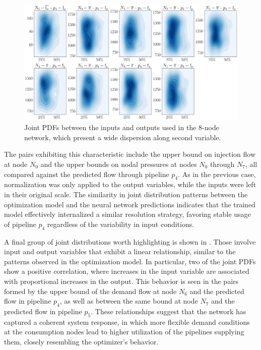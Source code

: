 \begin{figure}[htbp]
    \begin{center}
        \includegraphics[width=.7\textwidth]{figures/Chapter_NonLinealCensnet/inputs_outputs_1 KDE.png}
    \end{center}
    \caption{Joint PDFs between the inputs and outputs used in the 8-node network, which present a wide dispersion along second variable. }
    \label{fig:joint_distributions_inputs_outputs_1_KDE}
\end{figure}


The pairs exhibiting this characteristic include the upper bound on injection flow at node $N_0$ and the upper bounds on nodal pressures at nodes $N_0$ through $N_7$, all compared against the predicted flow through pipeline $p_4$. As in the previous case, normalization was only applied to the output variables, while the inputs were left in their original scale. The similarity in joint distribution patterns between the optimization model and the neural network predictions indicates that the trained model effectively internalized a similar resolution strategy, favoring stable usage of pipeline $p_4$ regardless of the variability in input conditions.


A final group of joint distributions worth highlighting is shown in . Those involve input and output variables that exhibit a linear relationship, similar to the patterns observed in the optimization model. In particular, two of the joint PDFs show a positive correlation, where increases in the input variable are associated with proportional increases in the output. This behavior is seen in the pairs formed by the upper bound of the demand flow at node $N_6$ and the predicted flow in pipeline $p_4$, as well as between the same bound at node $N_7$ and the predicted flow in pipeline $p_5$. These relationships suggest that the network has captured a coherent system response, in which more flexible demand conditions at the consumption nodes lead to higher utilization of the pipelines supplying them, closely resembling the optimizer’s behavior.


